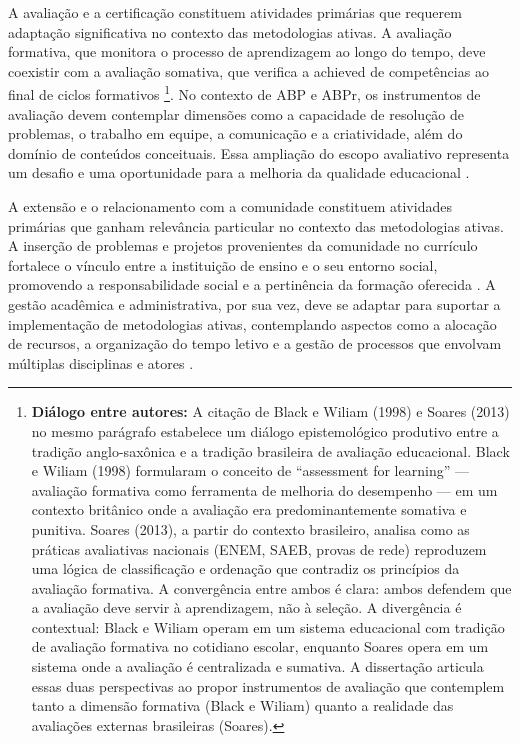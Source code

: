 A avaliação e a certificação constituem atividades primárias que requerem adaptação significativa no contexto das metodologias ativas. A avaliação formativa, que monitora o processo de aprendizagem ao longo do tempo, deve coexistir com a avaliação somativa, que verifica a achieved de competências ao final de ciclos formativos \cite{BLACK1998}\footnote{\textbf{Diálogo entre autores:} A citação de Black e Wiliam (1998) e Soares (2013) no mesmo parágrafo estabelece um diálogo epistemológico produtivo entre a tradição anglo-saxônica e a tradição brasileira de avaliação educacional. Black e Wiliam (1998) formularam o conceito de ``assessment for learning'' — avaliação formativa como ferramenta de melhoria do desempenho — em um contexto britânico onde a avaliação era predominantemente somativa e punitiva. Soares (2013), a partir do contexto brasileiro, analisa como as práticas avaliativas nacionais (ENEM, SAEB, provas de rede) reproduzem uma lógica de classificação e ordenação que contradiz os princípios da avaliação formativa. A convergência entre ambos é clara: ambos defendem que a avaliação deve servir à aprendizagem, não à seleção. A divergência é contextual: Black e Wiliam operam em um sistema educacional com tradição de avaliação formativa no cotidiano escolar, enquanto Soares opera em um sistema onde a avaliação é centralizada e sumativa. A dissertação articula essas duas perspectivas ao propor instrumentos de avaliação que contemplem tanto a dimensão formativa (Black e Wiliam) quanto a realidade das avaliações externas brasileiras (Soares).}. No contexto de ABP e ABPr, os instrumentos de avaliação devem contemplar dimensões como a capacidade de resolução de problemas, o trabalho em equipe, a comunicação e a criatividade, além do domínio de conteúdos conceituais. Essa ampliação do escopo avaliativo representa um desafio e uma oportunidade para a melhoria da qualidade educacional \cite{SOARES2013}.

A extensão e o relacionamento com a comunidade constituem atividades primárias que ganham relevância particular no contexto das metodologias ativas. A inserção de problemas e projetos provenientes da comunidade no currículo fortalece o vínculo entre a instituição de ensino e o seu entorno social, promovendo a responsabilidade social e a pertinência da formação oferecida \cite{BARRON1998}. A gestão acadêmica e administrativa, por sua vez, deve se adaptar para suportar a implementação de metodologias ativas, contemplando aspectos como a alocação de recursos, a organização do tempo letivo e a gestão de processos que envolvam múltiplas disciplinas e atores \cite{OLIVEIRA2023}.

